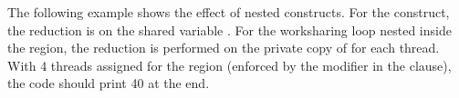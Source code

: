 The following example shows the effect of nested  constructs.
For the  construct, the reduction is on the shared variable
.  For the worksharing loop nested inside the 
region, the reduction is performed on the private copy of 
for each thread.
With 4 threads assigned for the  region
(enforced by the  modifier in the  clause),
the code should print 40 at the end.
